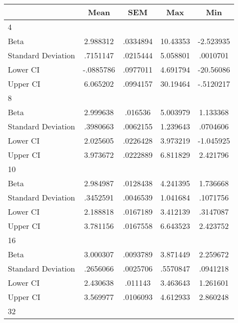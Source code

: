 {
\def\sym#1{\ifmmode^{#1}\else\(^{#1}\)\fi}
\begin{tabular}{l*{1}{cccc}}
\hline\hline
                    &        Mean&         SEM&         Max&         Min\\
\hline
4                   &            &            &            &            \\
Beta                &    2.988312&    .0334894&    10.43353&   -2.523935\\
Standard Deviation  &    .7151147&    .0215444&    5.058801&    .0010701\\
Lower CI            &   -.0885786&    .0977011&    4.691794&   -20.56086\\
Upper CI            &    6.065202&    .0994157&    30.19464&   -.5120217\\
\hline
8                   &            &            &            &            \\
Beta                &    2.999638&     .016536&    5.003979&    1.133368\\
Standard Deviation  &    .3980663&    .0062155&    1.239643&    .0704606\\
Lower CI            &    2.025605&    .0226428&    3.973219&   -1.045925\\
Upper CI            &    3.973672&    .0222889&    6.811829&    2.421796\\
\hline
10                  &            &            &            &            \\
Beta                &    2.984987&    .0128438&    4.241395&    1.736668\\
Standard Deviation  &    .3452591&    .0046539&    1.041684&    .1071756\\
Lower CI            &    2.188818&    .0167189&    3.412139&    .3147087\\
Upper CI            &    3.781156&    .0167558&    6.643523&    2.423752\\
\hline
16                  &            &            &            &            \\
Beta                &    3.000307&    .0093789&    3.871449&    2.259672\\
Standard Deviation  &    .2656066&    .0025706&    .5570847&    .0941218\\
Lower CI            &    2.430638&     .011143&    3.463643&    1.261601\\
Upper CI            &    3.569977&    .0106093&    4.612933&    2.860248\\
\hline
32                  &            &            &            &            \\

\end{tabular}}
